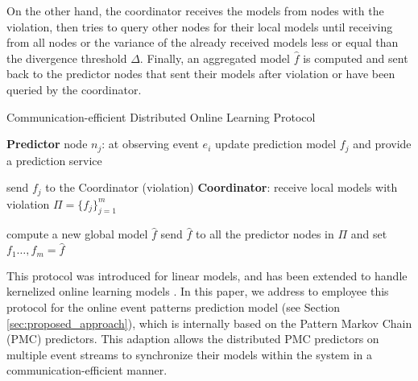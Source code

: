 \par On the other hand, the coordinator receives the models from nodes with the violation, then tries to query other nodes for their local models until receiving from all nodes or the variance of the already received models less or equal than the divergence threshold  $\Delta$. Finally, an aggregated model $\hat{f}$ is computed and sent back to the predictor nodes that sent their models after violation or have been queried by the coordinator.

\begin{algorithm}
	\caption{Communication-efficient Distributed Online Learning Protocol } 
	\begin{algorithmic}[1] 
		\Statex  \Indm  \textbf{Predictor} node $n_j$: at observing event $e_i$
		\Statex \Indp update prediction model $f_{j}$ and provide a prediction service 

		\Statex {}  
		\Statex send  $f_{j}$ to the Coordinator (violation) 
		\Statex \Indm \textbf{Coordinator}:
		\Statex \Indp receive local models with violation
		 $\Pi=\{f_{j}\}_{j=1}^m$
	
	
		\Statex {}
        \Statex
		\Statex compute a new global model $\hat{f}$ 
		\Statex send $\hat{f}$ to all the predictor nodes in $\Pi$ and set $f_{1}\dots, f_{m}=\hat{f} $ 
		\Statex {}
	\end{algorithmic}
	\label{algonline:dol}
\end{algorithm}


This protocol was introduced for linear models, and has been  extended to handle kernelized online learning models \cite{kamp2016communication}. In this paper, we address to employee this protocol for the online event patterns prediction model (see Section \ref{sec:proposed_approach}), which is internally based on the Pattern Markov Chain (PMC) predictors. This adaption allows the distributed PMC predictors on multiple event streams to  synchronize their models within the system in a communication-efficient manner. 

